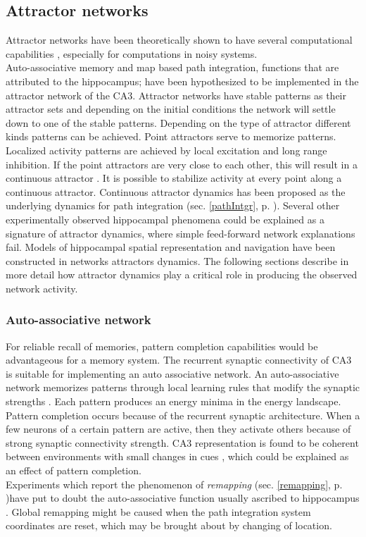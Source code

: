 \subsection{Attractor networks}
Attractor networks have been theoretically shown to have several computational capabilities \cite{Amit1992}, especially for computations in noisy systems.\\
Auto-associative memory and map based path integration, functions that are attributed to the hippocampus; have been hypothesized to be implemented in the attractor network of the CA3. Attractor networks have stable patterns as their attractor sets and depending on the initial conditions the network will settle down to one of the stable patterns. Depending on the type of attractor different kinds patterns can be achieved. Point attractors serve to memorize patterns. Localized activity patterns are achieved by local excitation and long range inhibition. If the point attractors are very close to each other, this will result in a continuous attractor \cite{Trappenberg2003}. It is possible to stabilize activity at every point along a continuous attractor. Continuous attractor dynamics has been proposed as the underlying dynamics for path integration (sec. \ref{pathIntgr}, p. \pageref{pathIntgr}). Several other experimentally observed hippocampal phenomena could be explained as a signature of attractor dynamics, where simple feed-forward network explanations fail. Models of hippocampal spatial representation and navigation have been constructed in networks attractors dynamics. The following sections describe in more detail how attractor dynamics play a critical role in producing the observed network activity.

\subsubsection{Auto-associative network}
\label{autoasso}
For reliable recall of memories, pattern completion capabilities would be advantageous for a memory system. The recurrent synaptic connectivity of CA3 is suitable for implementing an auto associative network. An auto-associative network memorizes patterns through local learning rules that modify the synaptic strengths \cite{Hopfield1982}. Each pattern produces an energy minima in the energy landscape. Pattern completion occurs because of the recurrent synaptic architecture. When a few neurons of a certain pattern are active, then they activate others because of strong synaptic connectivity strength. CA3 representation is found to be coherent between environments with small changes in cues \cite{Lee2004, Vazdarjanova2004}, which could be explained as an effect of pattern completion. \\
Experiments which report the phenomenon of \emph{remapping} \cite{Kubie1987, Wills2005, Leutgeb2005} (sec. \ref{remapping}, p. \pageref{remapping})have put to doubt the auto-associative function usually ascribed to  hippocampus \cite{Colgin2010}. Global remapping might be caused when the path integration system coordinates are reset, which may be brought about by changing of location.   

